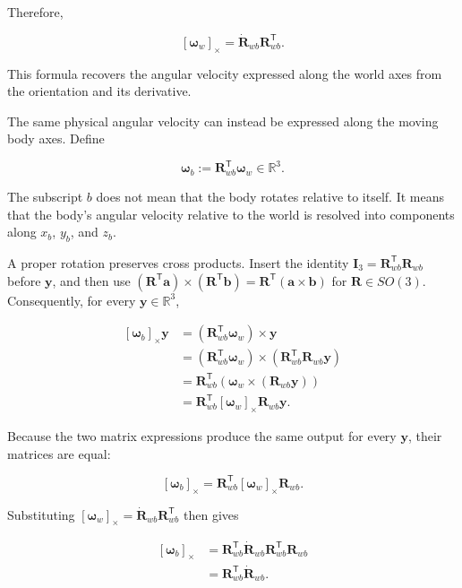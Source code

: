 \documentclass[
  australian,
  12pt,
  letterpaper,
  DIV=11,
  numbers=noendperiod,
  twoside]{scrreprt}
\begin{document}
Therefore,

\[
\boxed{
[\boldsymbol\omega_w]_\times
=
\dot{\mathbf R}_{wb}\mathbf R_{wb}^\mathsf T
}.
\]

This formula recovers the angular velocity expressed along the world
axes from the orientation and its derivative.

The same physical angular velocity can instead be expressed along the
moving body axes. Define

\[
\boxed{
\boldsymbol\omega_b
\mathrel{:=}
\mathbf R_{wb}^\mathsf T\boldsymbol\omega_w
\in\mathbb R^3
}.
\]

The subscript \(b\) does not mean that the body rotates relative to
itself. It means that the body's angular velocity relative to the world
is resolved into components along \(x_b\), \(y_b\), and \(z_b\).

A proper rotation preserves cross products. Insert the identity
\(\mathbf I_3=\mathbf R_{wb}^\mathsf T\mathbf R_{wb}\) before
\(\mathbf y\), and then use
\((\mathbf R^\mathsf T\mathbf a)\times(\mathbf R^\mathsf T\mathbf b)=\mathbf R^\mathsf T(\mathbf a\times\mathbf b)\)
for \(\mathbf R\in SO(3)\). Consequently, for every
\(\mathbf y\in\mathbb R^3\),

\[
\begin{aligned}
\left[\boldsymbol\omega_b\right]_\times\mathbf y
&=
(\mathbf R_{wb}^\mathsf T\boldsymbol\omega_w)\times\mathbf y\\
&=
(\mathbf R_{wb}^\mathsf T\boldsymbol\omega_w)
\times
(\mathbf R_{wb}^\mathsf T\mathbf R_{wb}\mathbf y)\\
&=
\mathbf R_{wb}^\mathsf T
\left(
\boldsymbol\omega_w\times(\mathbf R_{wb}\mathbf y)
\right)\\
&=
\mathbf R_{wb}^\mathsf T
[\boldsymbol\omega_w]_\times
\mathbf R_{wb}\mathbf y.
\end{aligned}
\]

Because the two matrix expressions produce the same output for every
\(\mathbf y\), their matrices are equal:

\[
[\boldsymbol\omega_b]_\times
=
\mathbf R_{wb}^\mathsf T
[\boldsymbol\omega_w]_\times
\mathbf R_{wb}.
\]

Substituting
\([\boldsymbol\omega_w]_\times=\dot{\mathbf R}_{wb}\mathbf R_{wb}^\mathsf T\)
then gives

\[
\begin{aligned}
[\boldsymbol\omega_b]_\times
&=
\mathbf R_{wb}^\mathsf T
\dot{\mathbf R}_{wb}
\mathbf R_{wb}^\mathsf T
\mathbf R_{wb}\\
&=
\mathbf R_{wb}^\mathsf T\dot{\mathbf R}_{wb}.
\end{aligned}
\]
\end{document}
